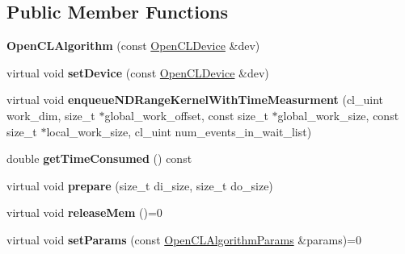 \subsection*{Public Member Functions}
\begin{DoxyCompactItemize}
\item 
\hypertarget{class_open_c_l_algorithm_a221df13217e01a0026fbfe5b362705fb}{{\bfseries Open\-C\-L\-Algorithm} (const \hyperlink{class_open_c_l_device}{Open\-C\-L\-Device} \&dev)}\label{class_open_c_l_algorithm_a221df13217e01a0026fbfe5b362705fb}

\item 
\hypertarget{class_open_c_l_algorithm_a0152457460f54706f5dc69b7bda0ebd5}{virtual void {\bfseries set\-Device} (const \hyperlink{class_open_c_l_device}{Open\-C\-L\-Device} \&dev)}\label{class_open_c_l_algorithm_a0152457460f54706f5dc69b7bda0ebd5}

\item 
\hypertarget{class_open_c_l_algorithm_a300df71ec71c9ad7ad4da25138bfd416}{virtual void {\bfseries enqueue\-N\-D\-Range\-Kernel\-With\-Time\-Measurment} (cl\-\_\-uint work\-\_\-dim, size\-\_\-t $\ast$global\-\_\-work\-\_\-offset, const size\-\_\-t $\ast$global\-\_\-work\-\_\-size, const size\-\_\-t $\ast$local\-\_\-work\-\_\-size, cl\-\_\-uint num\-\_\-events\-\_\-in\-\_\-wait\-\_\-list)}\label{class_open_c_l_algorithm_a300df71ec71c9ad7ad4da25138bfd416}

\item 
\hypertarget{class_open_c_l_algorithm_ab027e55b4160800a9fad870ce0959f20}{double {\bfseries get\-Time\-Consumed} () const }\label{class_open_c_l_algorithm_ab027e55b4160800a9fad870ce0959f20}

\item 
\hypertarget{class_open_c_l_algorithm_af33499028c20209c2ec19c8b30ec1472}{virtual void {\bfseries prepare} (size\-\_\-t di\-\_\-size, size\-\_\-t do\-\_\-size)}\label{class_open_c_l_algorithm_af33499028c20209c2ec19c8b30ec1472}

\item 
\hypertarget{class_open_c_l_algorithm_a5bdf8445ab8de2d7270994f904d4ad18}{virtual void {\bfseries release\-Mem} ()=0}\label{class_open_c_l_algorithm_a5bdf8445ab8de2d7270994f904d4ad18}

\item 
\hypertarget{class_open_c_l_algorithm_a7c7abb00a46ef44d22bfbddba0c3dcfc}{virtual void {\bfseries set\-Params} (const \hyperlink{class_open_c_l_algorithm_params}{Open\-C\-L\-Algorithm\-Params} \&params)=0}\label{class_open_c_l_algorithm_a7c7abb00a46ef44d22bfbddba0c3dcfc}


\end{DoxyCompactItemize}
